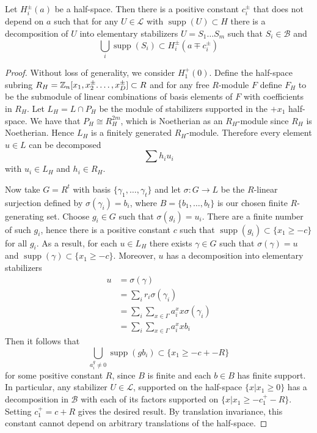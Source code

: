 \documentclass[11pt]{amsart}
\begin{document}
\begin{prop}\label{prop: Stabilizers decomposition support bound}
    Let $H_i^\pm(a)$ be a half-space. Then there is a positive constant $c_i^\pm$ that does not depend on $a$ such that for any $U\in\mathcal L$  with $\operatorname{supp}(U)\subset H$ there is a decomposition of $U$ into elementary stabilizers $U=S_1\ldots S_m$ such that $S_i\in\mathcal B$ and
    \[
        \bigcup_{i}\operatorname{supp}(S_i)\subset H_i^\pm(a\mp c_i^{\pm}) 
    \]

    \begin{proof}
        Without loss of generality, we consider $H_1^+(0)$. Define the half-space subring $R_H=\Bbb Z_n[x_1, x_2^\pm.\ldots, x_D^\pm]\subset R$ and for any free $R$-module $F$ define $F_H$ to be the submodule of linear combinations of basis elements of $F$ with coefficients in $R_H$. Let $L_H=L\cap P_H$ be the module of stabilizers supported in the $+x_1$ half-space. We have that $P_H\cong R_H^{2m}$, which is Noetherian as an $R_H$-module since $R_H$ is Noetherian. Hence $L_H$ is a finitely generated $R_H$-module. Therefore every element $u\in L$ can be decomposed 
        \[
            \sum h_i u_i
        \]
        with $u_i\in L_H$ and $h_i\in R_H$.
        \par Now take $G=R^t$ with basis $\{\gamma_1,\ldots,\gamma_t\}$ and let $\sigma:G\to L$ be the $R$-linear surjection defined by $\sigma(\gamma_i)=b_i$, where $B=\{b_1,\ldots,b_t\}$ is our chosen finite $R$-generating set. Choose $g_i\in G$ such that $\sigma(g_i)=u_i$. There are a finite number of such $g_i$, hence there is a positive constant $c$ such that $\operatorname{supp}(g_i)\subset \{x_1\geq -c\}$ for all $g_i$. As a result, for each $u\in L_H$ there exists $\gamma\in G$ such that $\sigma(\gamma)=u$ and $\operatorname{supp}(\gamma)\subset \{x_1\geq -c\}$. Moreover, $u$ has a decomposition into elementary stabilizers
        \begin{align*}
            u&=\sigma(\gamma)\\
            &= \sum_i r_i\sigma(\gamma_i) 
            \\
            &= \sum_i\sum_{x\in\Gamma}a_i^xx\sigma(\gamma_i) \\
            &= \sum_i\sum_{x\in\Gamma}a_i^xx b_i
        \end{align*}
        Then it follows that
        \[
            \bigcup_{a_i^g\neq0}\operatorname{supp}(gb_i)\subset\{x_1\geq -c+-R\} 
        \]
        for some positive constant $R$, since $B$ is finite and each $b\in B$ has finite support. In particular, any stabilizer $U\in\mathcal L$, supported on the half-space $\{x|x_1\geq 0\}$  has a decomposition in $\mathcal B$ with each of its factors supported on $\{x|x_1\geq  -c_1^+-R\}$. Setting $c_1^+=c+R$ gives the desired result. By translation invariance, this constant cannot depend on arbitrary translations of the half-space. 
    \end{proof}
\end{prop}
\end{document}
